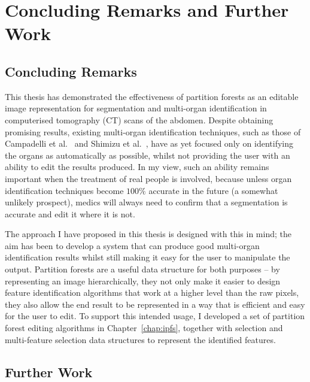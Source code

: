 \chapter{Concluding Remarks and Further Work}
\label{chap:conclusions}

\section{Concluding Remarks}

This thesis has demonstrated the effectiveness of partition forests as an editable image representation for segmentation and multi-organ identification in computerised tomography (CT) scans of the abdomen. Despite obtaining promising results, existing multi-organ identification techniques, such as those of Campadelli et al.\ \cite{campadelli09} and Shimizu et al.\ \cite{shimizu07}, have as yet focused only on identifying the organs as automatically as possible, whilst not providing the user with an ability to edit the results produced. In my view, such an ability remains important when the treatment of real people is involved, because unless organ identification techniques become $100\%$ accurate in the future (a somewhat unlikely prospect), medics will always need to confirm that a segmentation is accurate and edit it where it is not.

The approach I have proposed in this thesis is designed with this in mind; the aim has been to develop a system that can produce good multi-organ identification results whilst still making it easy for the user to manipulate the output. Partition forests are a useful data structure for both purposes -- by representing an image hierarchically, they not only make it easier to design feature identification algorithms that work at a higher level than the raw pixels, they also allow the end result to be represented in a way that is efficient and easy for the user to edit. To support this intended usage, I developed a set of partition forest editing algorithms in Chapter~\ref{chap:ipfs}, together with selection and multi-feature selection data structures to represent the identified features.

\section{Further Work}

\iffalse

